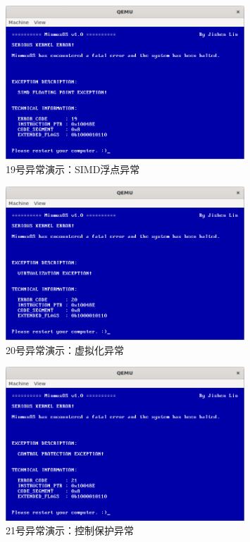 \begin{figure}[htbp]
    \centering
    \includegraphics[width=0.8\textwidth]{figures/Exception19Presentation.png}
    \caption{19号异常演示：SIMD浮点异常}
\end{figure}

\begin{figure}[htbp]
    \centering
    \includegraphics[width=0.8\textwidth]{figures/Exception20Presentation.png}
    \caption{20号异常演示：虚拟化异常}
\end{figure}

\begin{figure}[htbp]
    \centering
    \includegraphics[width=0.8\textwidth]{figures/Exception21Presentation.png}
    \caption{21号异常演示：控制保护异常}
\end{figure}

